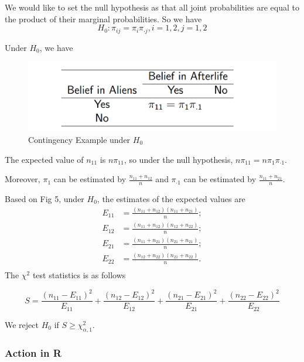 We would like to set the null hypothesis as that all joint probabilities are equal to the product of their marginal probabilities. So we have
\[H_0: \pi_{ij} = \pi_i \pi_{\cdot j}, i = 1, 2, j = 1, 2\]

Under $H_0$, we have 
\begin{figure}[H]
	\centering
	\includegraphics[width=0.7\linewidth]{fig/2x2-table5}
	\caption{Contingency Example under $H_0$}
	\label{fig:2x2-table5}
\end{figure}

The expected value of $n_{11}$ is $n \pi_{11}$, so under the null hypothesis, $n \pi_{11} = n \pi_{1} \pi_{\cdot 1}$.

Moreover, $\pi_1$ can be estimated by $\frac{n_{11} + n_{12}}{n}$ and $\pi_{\cdot 1}$ can be estimated by $\frac{n_{11} + n_{21}}{n}$.

Based on Fig 5, under $H_0$, the estimates of the expected values are
\begin{align*}
	E_{11} &= \frac{(n_{11} + n_{12})(n_{11} + n_{21})}{n};\\
	E_{12} &= \frac{(n_{11} + n_{12})(n_{12} + n_{22})}{n};\\
	E_{21} &= \frac{(n_{11} + n_{21})(n_{21} + n_{21})}{n};\\
	E_{22} &= \frac{(n_{12} + n_{22})(n_{21} + n_{22})}{n}.\\
\end{align*}
The $\chi^2$ test statistics is as follows

\[S = \frac{(n_{11} - E_{11})^2}{E_{11}} + \frac{(n_{12} - E_{12})^2}{E_{12}} + \frac{(n_{21} - E_{21})^2}{E_{21}} + \frac{(n_{22} - E_{22})^2}{E_{22}}\]

We reject $H_0$ if $S \ge \chi^2_{\alpha,1}$.

\subsubsection{Action in R}
